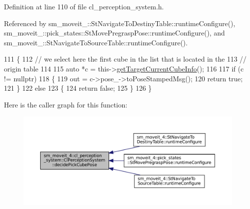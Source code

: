 Definition at line 110 of file cl\+\_\+perception\+\_\+system.\+h.



Referenced by sm\+\_\+moveit\+\_\+::\+St\+Navigate\+To\+Destiny\+Table\+::runtime\+Configure(), sm\+\_\+moveit\+\_\+::pick\+\_\+states\+::\+St\+Move\+Pregrasp\+Pose\+::runtime\+Configure(), and sm\+\_\+moveit\+\_\+::\+St\+Navigate\+To\+Source\+Table\+::runtime\+Configure().


\begin{DoxyCode}
111             \{
112                 \textcolor{comment}{// we select here the first cube in the list that is located in the}
113                 \textcolor{comment}{// origin table}
114 
115                 \textcolor{keyword}{auto} *c = this->\hyperlink{classsm__moveit__4_1_1cl__perception__system_1_1ClPerceptionSystem_ac4b944cebb2055a85a33129665df5dcf}{getTargetCurrentCubeInfo}();
116 
117                 \textcolor{keywordflow}{if} (c != \textcolor{keyword}{nullptr})
118                 \{
119                     out = c->pose\_->toPoseStampedMsg();
120                     \textcolor{keywordflow}{return} \textcolor{keyword}{true};
121                 \}
122                 \textcolor{keywordflow}{else}
123                 \{
124                     \textcolor{keywordflow}{return} \textcolor{keyword}{false};
125                 \}
126             \}
\end{DoxyCode}
Here is the caller graph for this function\+:
\nopagebreak
\begin{figure}[H]
\begin{center}
\leavevmode
\includegraphics[width=350pt]{classsm__moveit__4_1_1cl__perception__system_1_1ClPerceptionSystem_af1143d68db667021480383673244bb04_icgraph}
\end{center}
\end{figure}
\mbox{\label{classsm__moveit__4_1_1cl__perception__system_1_1ClPerceptionSystem_af6ff9a225d451bdee312573296ed02a8}} 
